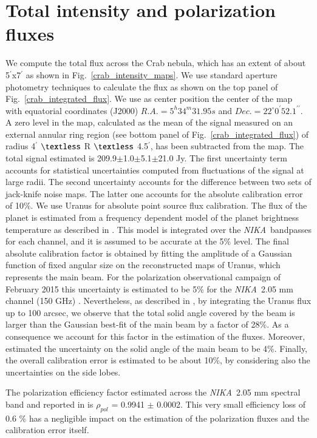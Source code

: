 \documentclass[twocolumn,traditabstract]{aa}
\def\NIKA{\textit{NIKA}}
\begin{document}
\section{Total intensity and polarization fluxes}\label{sec:Polarization estimates in CMB experiments like beams}
We compute the total flux across the Crab nebula, which has an extent of about
5$^{\prime}$x7$^{\prime}$ as shown in Fig.~\ref{crab_intensity_maps}.  We use
standard aperture photometry techniques to calculate the flux as shown on the top panel of
Fig.~\ref{crab_integrated_flux}. We use as center position the center of the
map with equatorial coordinates (J2000) $R.A. = 5^h34^m31.95s$ and $Dec. = 22^{\circ}0^{\prime}52.1^{\prime\prime}$. A zero level in the map, calculated as the mean of the signal measured on
an external annular ring region (see bottom panel of
Fig.~\ref{crab_integrated_flux}) of radius 4$^\prime$ $\textless$ R $\textless$
4.5$^\prime$, has been subtracted from the map. The total signal estimated is
209.9$\pm$1.0$\pm$5.1$\pm$21.0 Jy. The first uncertainty term accounts for statistical
uncertainties computed from fluctuations of the signal at large radii. The second uncertainty accounts for the difference between two sets of jack-knife noise maps. The latter one accounts for the absolute calibration error of 10\%.
We use Uranus for absolute point source flux calibration. The flux of the planet is estimated from a frequency dependent model of the planet brightness temperature as described in \cite{moreno2010}. 
This model is integrated over the \NIKA\ bandpasses for each channel, and it is assumed to be accurate at the 5\% level. The final absolute calibration factor is obtained by fitting the amplitude of a Gaussian function of fixed angular size on the reconstructed maps of Uranus, which represents the main beam. For the polarization observational campaign of February 2015 this uncertainty is estimated to be 5\% for the \NIKA\ 2.05 mm channel (150 GHz) \citep{ritacco2017}. 
Nevertheless, as described in \cite{adam2013, catalano2014}, by integrating the Uranus flux up to 100 arcsec, we observe that the total solid angle covered by the beam is larger than the Gaussian best-fit of the main beam by a factor of 28\%. As a consequence we account for this factor in the estimation of the fluxes.
Moreover, \cite{adam2013} estimated the uncertainty on the solid angle of the main beam to be 4\%.
Finally, the overall calibration error is estimated to be about 10\%, by considering also the uncertainties on the side lobes.

The polarization efficiency factor estimated across the \NIKA\ 2.05 mm spectral band and reported in \cite{ritacco2017} is $\rho_{pol}$ = 0.9941 $\pm$ 0.0002. This very small efficiency loss of 0.6 \% has a negligible impact on the estimation of the polarization fluxes and the calibration error itself. 
\end{document}
